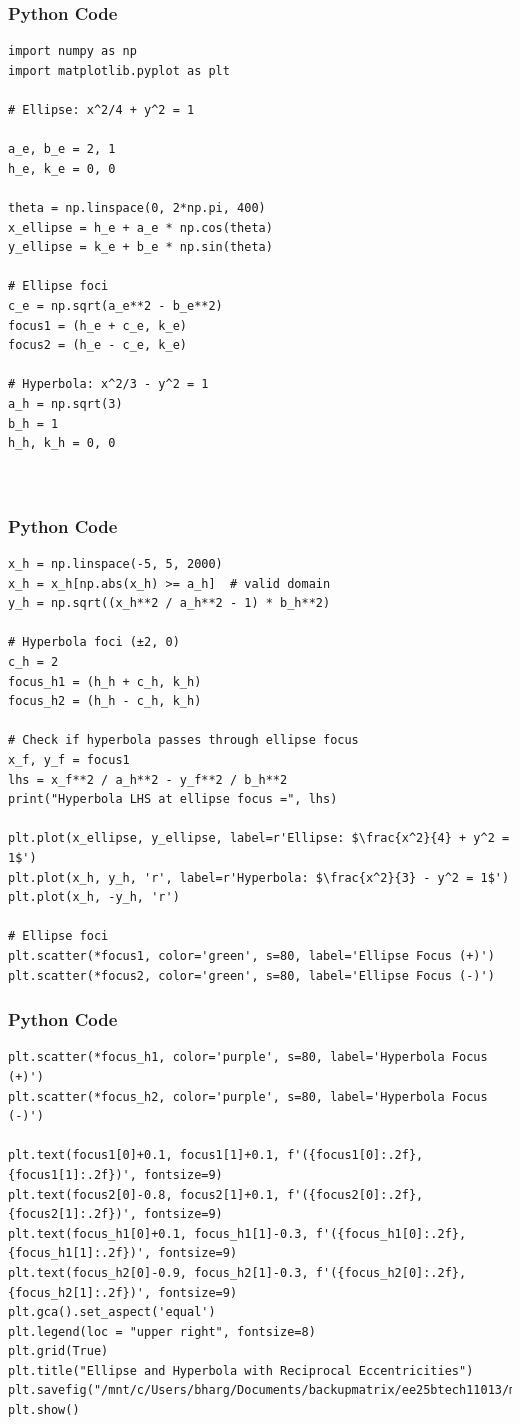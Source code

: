 \documentclass{beamer}
\begin{document}
\begin{frame}[fragile]
    \frametitle{Python Code}
    \begin{lstlisting}
import numpy as np
import matplotlib.pyplot as plt

# Ellipse: x^2/4 + y^2 = 1

a_e, b_e = 2, 1
h_e, k_e = 0, 0

theta = np.linspace(0, 2*np.pi, 400)
x_ellipse = h_e + a_e * np.cos(theta)
y_ellipse = k_e + b_e * np.sin(theta)

# Ellipse foci
c_e = np.sqrt(a_e**2 - b_e**2)
focus1 = (h_e + c_e, k_e)
focus2 = (h_e - c_e, k_e)

# Hyperbola: x^2/3 - y^2 = 1
a_h = np.sqrt(3)
b_h = 1
h_h, k_h = 0, 0



    \end{lstlisting}
\end{frame}
\begin{frame}[fragile]
    \frametitle{Python Code}
    \begin{lstlisting}
x_h = np.linspace(-5, 5, 2000)
x_h = x_h[np.abs(x_h) >= a_h]  # valid domain
y_h = np.sqrt((x_h**2 / a_h**2 - 1) * b_h**2)

# Hyperbola foci (±2, 0)
c_h = 2
focus_h1 = (h_h + c_h, k_h)
focus_h2 = (h_h - c_h, k_h)

# Check if hyperbola passes through ellipse focus
x_f, y_f = focus1
lhs = x_f**2 / a_h**2 - y_f**2 / b_h**2
print("Hyperbola LHS at ellipse focus =", lhs)

plt.plot(x_ellipse, y_ellipse, label=r'Ellipse: $\frac{x^2}{4} + y^2 = 1$')
plt.plot(x_h, y_h, 'r', label=r'Hyperbola: $\frac{x^2}{3} - y^2 = 1$')
plt.plot(x_h, -y_h, 'r')

# Ellipse foci
plt.scatter(*focus1, color='green', s=80, label='Ellipse Focus (+)')
plt.scatter(*focus2, color='green', s=80, label='Ellipse Focus (-)')

    \end{lstlisting}
\end{frame}
\begin{frame}[fragile]
    \frametitle{Python Code}
    \begin{lstlisting}
plt.scatter(*focus_h1, color='purple', s=80, label='Hyperbola Focus (+)')
plt.scatter(*focus_h2, color='purple', s=80, label='Hyperbola Focus (-)')

plt.text(focus1[0]+0.1, focus1[1]+0.1, f'({focus1[0]:.2f}, {focus1[1]:.2f})', fontsize=9)
plt.text(focus2[0]-0.8, focus2[1]+0.1, f'({focus2[0]:.2f}, {focus2[1]:.2f})', fontsize=9)
plt.text(focus_h1[0]+0.1, focus_h1[1]-0.3, f'({focus_h1[0]:.2f}, {focus_h1[1]:.2f})', fontsize=9)
plt.text(focus_h2[0]-0.9, focus_h2[1]-0.3, f'({focus_h2[0]:.2f}, {focus_h2[1]:.2f})', fontsize=9)
plt.gca().set_aspect('equal')
plt.legend(loc = "upper right", fontsize=8) 
plt.grid(True)
plt.title("Ellipse and Hyperbola with Reciprocal Eccentricities")
plt.savefig("/mnt/c/Users/bharg/Documents/backupmatrix/ee25btech11013/matgeo/8.4.16/figs/Figure_1.png")
plt.show()


    \end{lstlisting}
\end{frame}
\end{document}
